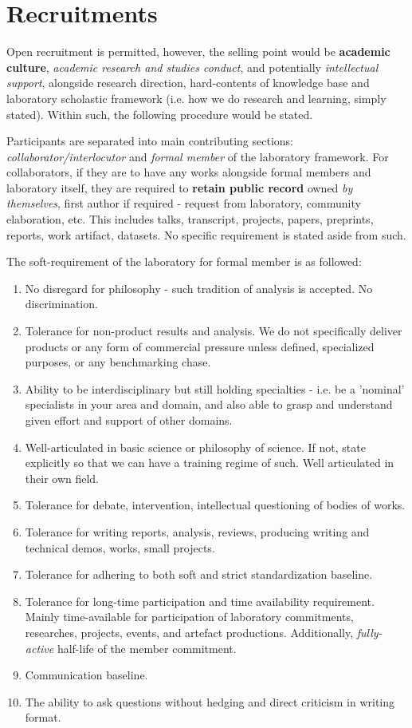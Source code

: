 \documentclass[9pt,a4paper]{article}
\begin{document}
\section{Recruitments}

Open recruitment is permitted, however, the selling point would be \textbf{academic culture}, \textit{academic research and studies conduct}, and potentially \textit{intellectual support}, alongside research direction, hard-contents of knowledge base and laboratory scholastic framework (i.e. how we do research and learning, simply stated). Within such, the following procedure would be stated. 

Participants are separated into main contributing sections: \textit{collaborator/interlocutor} and \textit{formal member} of the laboratory framework. For collaborators, if they are to have any works alongside formal members and laboratory itself, they are required to \textbf{retain public record} owned \textit{by themselves}, first author if required - request from laboratory, community elaboration, etc. This includes talks, transcript, projects, papers, preprints, reports, work artifact, datasets. No specific requirement is stated aside from such.

The soft-requirement of the laboratory for formal member is as followed:
\begin{enumerate}[itemsep=1pt,topsep=1pt]
    \item No disregard for philosophy - such tradition of analysis is accepted. No discrimination. 
    \item Tolerance for non-product results and analysis. We do not specifically deliver products or any form of commercial pressure unless defined, specialized purposes, or any benchmarking chase. 
    \item Ability to be interdisciplinary but still holding specialties - i.e. be a 'nominal' specialists in your area and domain, and also able to grasp and understand given effort and support of other domains. 
    \item Well-articulated in basic science or philosophy of science. If not, state explicitly so that we can have a training regime of such. Well articulated in their own field. 
    \item Tolerance for debate, intervention, intellectual questioning of bodies of works. 
    \item Tolerance for writing reports, analysis, reviews, producing writing and technical demos, works, small projects. 
    \item Tolerance for adhering to both soft and strict standardization baseline.
    \item Tolerance for long-time participation and time availability requirement. Mainly time-available for participation of laboratory commitments, researches, projects, events, and artefact productions. Additionally, \textit{fully-active} half-life of the member commitment. 
    \item Communication baseline. 
    \item The ability to ask questions without hedging and direct criticism in writing format. 
\end{enumerate}
\end{document}
